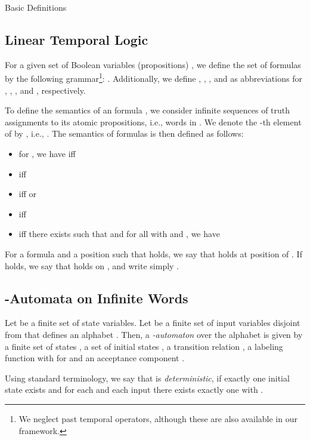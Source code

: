 \documentclass[copyright,creativecommons]{eptcs}
\begin{document}
\begin{section}{Basic Definitions}
\label{BasicDefinitions}
\subsection{Linear Temporal Logic}

For a given set of Boolean variables (propositions) , we define the set of  formulas by the following grammar\footnote{We neglect past temporal operators, although these are also available in our framework.}:
.
Additionally, we define , , , and  as abbreviations for , , , and , respectively.

To define the semantics of an  formula , we consider infinite sequences of truth assignments to its atomic propositions, i.e., words in . We denote the -th element of  by , i.e., . The semantics of  formulas is then defined as follows:
\begin{itemize}
\item for , we have  iff 
\item  iff 
\item  iff  or 
\item  iff 
\item  iff there exists  such that  and for all  with  and , we have 
\end{itemize}
For a formula  and a position  such that  holds, we say that  holds at position  of . If  holds, we say that  holds on , and write simply .




\subsection{-Automata on Infinite Words}

\begin{definition}[-Automata]
Let  be a finite set of state variables. Let  be a finite set of input variables disjoint from  that defines an alphabet . Then, a \emph{-automaton}  over the alphabet  is given by a finite set of states , a set of initial states , a transition relation , a labeling function  with  for  and an acceptance component .
\end{definition}

\noindent Using standard terminology, we say that  is \emph{deterministic}, if exactly one initial state exists and for each  and each input  there exists exactly one  with  .


\end{section}
\end{document}
